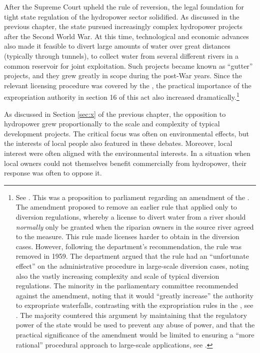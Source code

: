 After the Supreme Court upheld the rule of reversion, the legal foundation for tight state regulation of the hydropower sector solidified. As discussed in the previous chapter, the state pursued increasingly complex hydropower projects after the Second World War. At this time, technological and economic advances also made it feasible to divert large amounts of water over great distances (typically through tunnels), to collect water from several different rivers in a common reservoir for joint exploitation. Such projects became known as ``gutter'' projects, and they grew greatly in scope during the post-War years. Since the relevant licensing procedure was covered by the \cite{wra17}, the practical importance of the expropriation authority in section 16 of this act also increased dramatically.\footnote{See \cite[11]{innst59}. This was a proposition to parliament regarding an amendment of the \cite{wra17}. The amendment proposed to remove an earlier rule that applied only to diversion regulations, whereby a license to divert water from a river should {\it normally} only be granted when the riparian owners in the source river agreed to the measure. This rule made licenses harder to obtain in the diversion cases. However, following the department's recommendation, the rule was removed in 1959. The department argued that the rule had an ``unfortunate effect'' on the administrative procedure in large-scale diversion cases, noting also the vastly increasing complexity and scale of typical diversion regulations. The minority in the parliamentary committee recommended against the amendment, noting that it would ``greatly increase'' the authority to expropriate waterfalls, contrasting with the expropriation rules in the \cite{wra40}, see \cite[14]{innst59}. The majority countered this argument by maintaining that the regulatory power of the state would be used to prevent any abuse of power, and that the practical significance of the amendment would be limited to ensuring a ``more rational'' procedural approach to large-scale applications, see \cite[14]{innst59}.}

As discussed in Section \ref{sec:x} of the previous chapter, the opposition to hydropower grew proportionally to the scale and complexity of typical development projects. The critical focus was often on environmental effects, but the interests of local people also featured in these debates. 
Moreover, local interest were often aligned with the environmental interests. In a situation when local owners could not themselves benefit commercially  from hydropower, their response was often to oppose it. 


